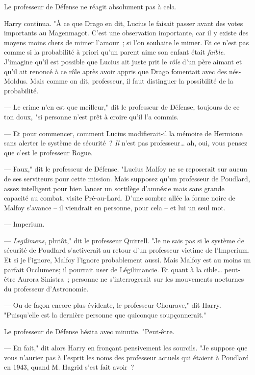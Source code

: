 Le professeur de Défense ne réagit absolument pas à cela.

Harry continua. "À ce que Drago en dit, Lucius le faisait passer avant des votes importants au Magenmagot. C'est une observation importante, car il y existe des moyens moins chers de mimer l'amour~; si l'on souhaite le mimer. Et ce n'est pas comme si la probabilité à priori qu'un parent aime son enfant était \emph{faible}. J'imagine qu'il est possible que Lucius ait juste prit le \emph{rôle} d'un père aimant et qu'il ait renoncé à ce rôle après avoir appris que Drago fomentait avec des nés-Moldus. Mais comme on dit, professeur, il faut distinguer la possibilité de la probabilité.

--- Le crime n'en est que meilleur," dit le professeur de Défense, toujours de ce ton doux, "si personne n'est prêt à croire qu'il l'a commis.

--- Et pour commencer, comment Lucius modifierait-il la mémoire de Hermione sans alerter le système de sécurité~? \emph{Il} n'est pas professeur… ah, oui, vous pensez que c'est le professeur Rogue.

--- Faux," dit le professeur de Défense. "Lucius Malfoy ne se reposerait sur aucun de ses serviteurs pour cette mission. Mais supposez qu'un professeur de Poudlard, assez intelligent pour bien lancer un sortilège d'amnésie mais sans grande capacité au combat, visite Pré-au-Lard. D'une sombre allée la forme noire de Malfoy s'avance -- il viendrait en personne, pour cela -- et lui un seul mot.

--- Imperium.

--- \emph{Legilimens}, plutôt," dit le professeur Quirrell. "Je ne sais pas si le système de sécurité de Poudlard s'activerait au retour d'un professeur victime de l'Imperium. Et si je l'ignore, Malfoy l'ignore probablement aussi. Mais Malfoy est au moins un parfait Occlumens; il pourrait user de Légilimancie. Et quant à la cible… peut-être Aurora Sinistra~; personne ne s'interrogerait sur les mouvements nocturnes du professeur d'Astronomie.

--- Ou de façon encore plus évidente, le professeur Chourave," dit Harry. "Puisqu'elle est la dernière personne que quiconque soupçonnerait."

Le professeur de Défense hésita avec minutie. "Peut-être.

--- En fait," dit alors Harry en fronçant pensivement les sourcils. "Je suppose que vous n'auriez pas à l'esprit les noms des professeur actuels qui étaient à Poudlard en 1943, quand M. Hagrid s'est fait avoir~?

